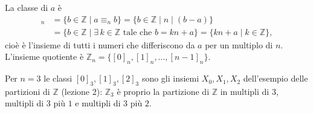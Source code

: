 \documentclass[11pt,a4paper]{article}
\begin{document}
La classe di $a$ è
\begin{align*}
[a]_n &= \{b \in \mathbb{Z} \mid a \equiv_n b\}
       = \{b \in \mathbb{Z} \mid n \mid (b - a)\} \\
      &= \{b \in \mathbb{Z} \mid \exists\, k \in \mathbb{Z} \text{ tale
         che } b = kn + a\}
       = \{kn + a \mid k \in \mathbb{Z}\},
\end{align*}
cioè è l'insieme di tutti i numeri che differiscono da $a$ per un multiplo
di $n$. L'insieme quotiente è
$\mathbb{Z}_n = \{[0]_n, [1]_n, \dots, [n-1]_n\}$.

\begin{esempio}
Per $n = 3$ le classi $[0]_3, [1]_3, [2]_3$ sono gli insiemi $X_0, X_1,
X_2$ dell'esempio delle partizioni di $\mathbb{Z}$ (lezione 2): $\mathbb{Z}_3$ è proprio la partizione
di $\mathbb{Z}$ in multipli di $3$, multipli di $3$ più $1$ e multipli di
$3$ più $2$.
\end{esempio}
\end{document}
